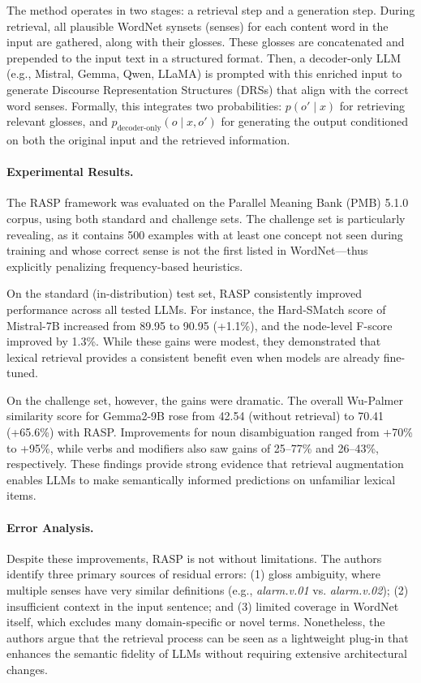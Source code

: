 The method operates in two stages: a retrieval step and a generation step. During retrieval, all plausible WordNet synsets (senses) for each content word in the input are gathered, along with their glosses. These glosses are concatenated and prepended to the input text in a structured format. Then, a decoder-only LLM (e.g., Mistral, Gemma, Qwen, LLaMA) is prompted with this enriched input to generate Discourse Representation Structures (DRSs) that align with the correct word senses. Formally, this integrates two probabilities: \( p(o' \mid x) \) for retrieving relevant glosses, and \( p_{\text{decoder-only}}(o \mid x, o') \) for generating the output conditioned on both the original input and the retrieved information.

\paragraph{Experimental Results.} The RASP framework was evaluated on the Parallel Meaning Bank (PMB) 5.1.0 corpus, using both standard and challenge sets. The challenge set is particularly revealing, as it contains 500 examples with at least one concept not seen during training and whose correct sense is not the first listed in WordNet—thus explicitly penalizing frequency-based heuristics.

On the standard (in-distribution) test set, RASP consistently improved performance across all tested LLMs. For instance, the Hard-SMatch score of Mistral-7B increased from 89.95 to 90.95 (+1.1\%), and the node-level F-score improved by 1.3\%. While these gains were modest, they demonstrated that lexical retrieval provides a consistent benefit even when models are already fine-tuned.

On the challenge set, however, the gains were dramatic. The overall Wu-Palmer similarity score for Gemma2-9B rose from 42.54 (without retrieval) to 70.41 (+65.6\%) with RASP. Improvements for noun disambiguation ranged from +70\% to +95\%, while verbs and modifiers also saw gains of 25--77\% and 26--43\%, respectively. These findings provide strong evidence that retrieval augmentation enables LLMs to make semantically informed predictions on unfamiliar lexical items.

\paragraph{Error Analysis.} Despite these improvements, RASP is not without limitations. The authors identify three primary sources of residual errors: (1) gloss ambiguity, where multiple senses have very similar definitions (e.g., \textit{alarm.v.01} vs. \textit{alarm.v.02}); (2) insufficient context in the input sentence; and (3) limited coverage in WordNet itself, which excludes many domain-specific or novel terms. Nonetheless, the authors argue that the retrieval process can be seen as a lightweight plug-in that enhances the semantic fidelity of LLMs without requiring extensive architectural changes.

